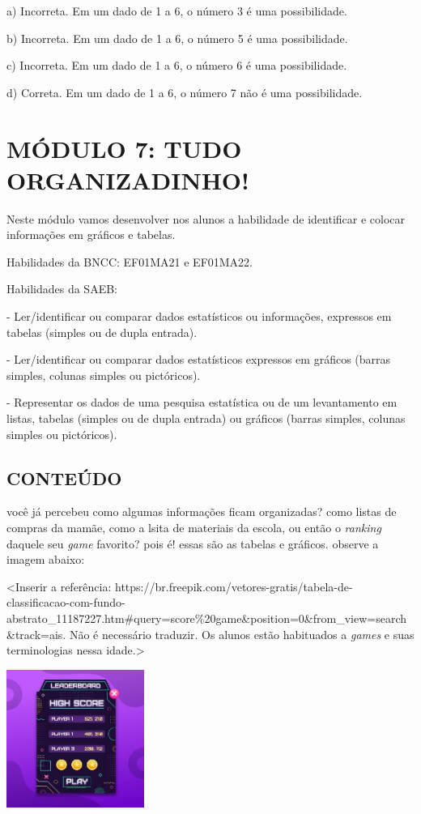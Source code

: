a) Incorreta. Em um dado de 1 a 6, o número 3 é uma possibilidade.

b) Incorreta. Em um dado de 1 a 6, o número 5 é uma possibilidade.

c) Incorreta. Em um dado de 1 a 6, o número 6 é uma possibilidade.

d) Correta. Em um dado de 1 a 6, o número 7 não é uma possibilidade.

\section{MÓDULO 7: TUDO
ORGANIZADINHO!}\label{muxf3dulo-7-tudo-organizadinho}

Neste módulo vamos desenvolver nos alunos a habilidade de identificar e
colocar informações em gráficos e tabelas.

Habilidades da BNCC: EF01MA21 e EF01MA22.

Habilidades da SAEB:

- Ler/identificar ou comparar dados estatísticos ou informações,
expressos em tabelas (simples ou de dupla entrada).

- Ler/identificar ou comparar dados estatísticos expressos em gráficos
(barras simples, colunas simples ou pictóricos).

- Representar os dados de uma pesquisa estatística ou de um levantamento
em listas, tabelas (simples ou de dupla entrada) ou gráficos (barras
simples, colunas simples ou pictóricos).

\subsection{CONTEÚDO}\label{conteuxfado-6}

você já percebeu como algumas informações ficam organizadas? como listas
de compras da mamãe, como a lsita de materiais da escola, ou então o
\emph{ranking} daquele seu \emph{game} favorito? pois é! essas são as
tabelas e gráficos. observe a imagem abaixo:

\textless{}Inserir a referência:
https://br.freepik.com/vetores-gratis/tabela-de-classificacao-com-fundo-abstrato\_11187227.htm\#query=score\%20game\&position=0\&from\_view=search\&track=ais.
Não é necessário traduzir. Os alunos estão habituados a \emph{games} e
suas terminologias nessa idade.\textgreater{}

\includegraphics[width=1.77083in,height=1.77083in]{media/image93.jpg}

